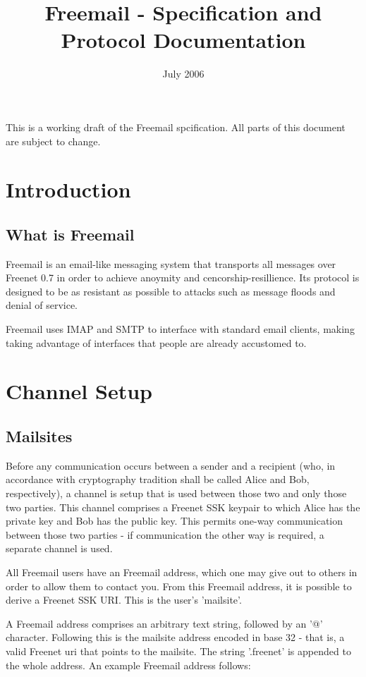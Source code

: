 \documentclass[12pt,a4paper]{article}
\begin{document}
\title{Freemail - Specification and Protocol Documentation}
\date{July 2006}
\maketitle

This is a working draft of the Freemail spcification. All parts of this document are subject to change.

\section{Introduction}
\subsection{What is Freemail}
Freemail is an email-like messaging system that transports all messages over Freenet 0.7 in order to achieve anoymity and cencorship-resillience. Its protocol is designed to be as resistant as possible to attacks such as message floods and denial of service.

Freemail uses IMAP and SMTP to interface with standard email clients, making taking advantage of interfaces that people are already accustomed to.

\section{Channel Setup}
\subsection{Mailsites}
Before any communication occurs between a sender and a recipient (who, in accordance with cryptography tradition shall be called Alice and Bob, respectively), a channel is setup that is used between those two and only those two parties. This channel comprises a Freenet SSK keypair to which Alice has the private key and Bob has the public key. This permits one-way communication between those two parties - if communication the other way is required, a separate channel is used.

All Freemail users have an Freemail address, which one may give out to others in order to allow them to contact you. From this Freemail address, it is possible to derive a Freenet SSK URI. This is the user's 'mailsite'.

A Freemail address comprises an arbitrary text string, followed by an '@' character. Following this is the mailsite address encoded in base 32 - that is, a valid Freenet uri that points to the mailsite. The string '.freenet' is appended to the whole address. An example Freemail address follows:
\end{document}
